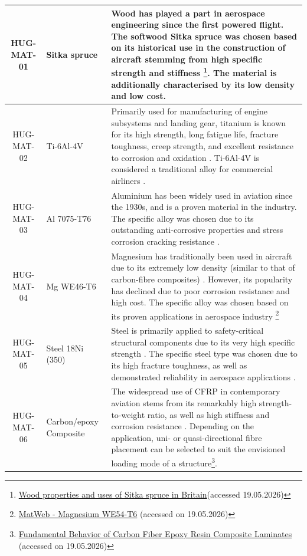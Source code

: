 \begin{longtable}{|c|p{2.25cm}|p{10.75cm}|}
        HUG-MAT-01 & Sitka spruce &  Wood has played a part in aerospace engineering since the first powered flight. The softwood Sitka spruce was chosen based on its historical use in the construction of aircraft stemming from high specific strength and stiffness \footnote{\href{https://www.forestresearch.gov.uk/publications/wood-properties-and-uses-of-sitka-spruce-in-britain/}{Wood properties and uses of Sitka spruce in Britain}(accessed 19.05.2026)}. The material is additionally characterised by its low density and low cost. \\\hline
        HUG-MAT-02 & Ti-6Al-4V & Primarily used for manufacturing of engine subsystems and landing gear, titanium is known for its high strength, long fatigue life, fracture toughness, creep strength,
        and excellent resistance to corrosion and oxidation \cite{Mouritz2012}. Ti-6Al-4V is considered a traditional alloy for commercial airliners \cite{titanium_use_airbus_boeing}. \\\hline
        HUG-MAT-03 & Al 7075-T76 &  Aluminium has been widely used in aviation since the 1930s, and is a proven material in the industry. The specific alloy was chosen due to its outstanding anti-corrosive properties and stress corrosion cracking resistance \cite{LI2023944}. \\\hline
        HUG-MAT-04 & Mg WE46-T6 & Magnesium has traditionally been used in aircraft due to its extremely low density (similar to that of carbon-fibre composites) \cite{Mouritz2012}. However, its popularity has declined due to poor corrosion resistance and high cost. The specific alloy was chosen based on its proven applications in aerospace industry \footnote{\href{https://www.matweb.com/search/datasheet.aspx?matguid=f41ac8bc1ddd4c1d85247e646b3ec2be}{MatWeb - Magnesium WE54-T6} (accessed on 19.05.2026)}  \\\hline
        HUG-MAT-05 & Steel 18Ni (350)
        & Steel is primarily applied to safety-critical structural components due to its very high specific strength \cite{Mouritz2012}. The specific steel type was chosen due to its high fracture toughness, as well as demonstrated reliability in aerospace applications \cite{ANTOLOVICH1980717}.\\\hline
        HUG-MAT-06 & Carbon/epoxy Composite & The widespread use of CFRP in contemporary aviation stems from its remarkably high strength-to-weight ratio, as well as high stiffness and corrosion resistance \cite{Mouritz2012}. Depending on the application, uni- or quasi-directional fibre placement can be selected to suit the envisioned loading mode of a structure\footnote{\href{https://www.abbottaerospace.com/aa-sb-001/4-materials/4-1-composite-materials/4-1-3-fundamental-behavior-of-carbon-fiber-epoxy-resin-composite-laminates/}{Fundamental Behavior of Carbon Fiber Epoxy Resin Composite Laminates} (accessed on 19.05.2026)}.
        

\end{longtable}

